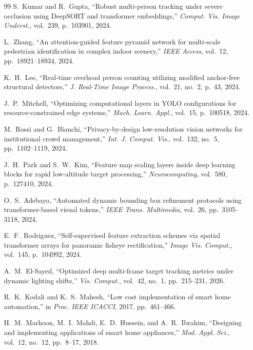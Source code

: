 \begin{thebibliography}{99}
S.~Kumar and R.~Gupta, ``Robust multi-person tracking under severe occlusion using DeepSORT and transformer embeddings,'' \textit{Comput. Vis. Image Underst.}, vol.~239, p.~103901, 2024.

L.~Zhang, ``An attention-guided feature pyramid network for multi-scale pedestrian identification in complex indoor scenery,'' \textit{IEEE Access}, vol.~12, pp.~18921--18934, 2024.

K.~H.~Lee, ``Real-time overhead person counting utilizing modified anchor-free structural detectors,'' \textit{J. Real-Time Image Process.}, vol.~21, no.~2, p.~43, 2024.

J.~P.~Mitchell, ``Optimizing computational layers in YOLO configurations for resource-constrained edge systems,'' \textit{Mach. Learn. Appl.}, vol.~15, p.~100518, 2024.

M.~Rossi and G.~Bianchi, ``Privacy-by-design low-resolution vision networks for institutional crowd management,'' \textit{Int. J. Comput. Vis.}, vol.~132, no.~5, pp.~1102--1119, 2024.

J.~H.~Park and S.~W.~Kim, ``Feature map scaling layers inside deep learning blocks for rapid low-altitude target processing,'' \textit{Neurocomputing}, vol.~580, p.~127410, 2024.

O.~S.~Adebayo, ``Automated dynamic bounding box refinement protocols using transformer-based visual tokens,'' \textit{IEEE Trans. Multimedia}, vol.~26, pp.~3105--3118, 2024.

E.~F.~Rodriguez, ``Self-supervised feature extraction schemes via spatial transformer arrays for panoramic fisheye rectification,'' \textit{Image Vis. Comput.}, vol.~145, p.~104992, 2024.

A.~M.~El-Sayed, ``Optimized deep multi-frame target tracking metrics under dynamic lighting shifts,'' \textit{Vis. Comput.}, vol.~42, no.~1, pp.~215--231, 2026.

R.~K.~Kodali and K.~S.~Mahesh, ``Low cost implementation of smart home automation,'' in \textit{Proc. IEEE ICACCI}, 2017, pp.~461--466.

H.~M.~Marhoon, M.~I.~Mahdi, E.~D.~Hussein, and A.~R.~Ibrahim, ``Designing and implementing applications of smart home appliances,'' \textit{Mod. Appl. Sci.}, vol.~12, no.~12, pp.~8--17, 2018.


\end{thebibliography}
